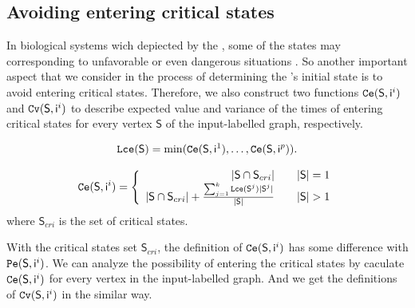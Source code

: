 \subsection{Avoiding entering critical states}
In biological systems wich depiected by the \BCNs, some of the states may corresponding to unfavorable or even dangerous situations \cite{Li2014Controllability}. So another important aspect that we consider in the process of determining the \BCN's initial state is to avoid entering critical states. Therefore, we also construct two functions ${\tt Ce}(\mathsf{S}, \mathsf{ i}^{i})$ and ${\tt Cv}(\mathsf{S}, \mathsf{ i}^{i})$ to describe expected value and variance of the times of entering critical states for every vertex $\mathsf{S}$ of the input-labelled graph, respectively. 
\begin{definition} \label{lce}
\begin{equation}
\begin{split}
{\tt Lce}(\mathsf{S})= \min({\tt Ce}(\mathsf{S}, \mathsf{ i}^{1}),\ldots,{\tt Ce}(\mathsf{S}, \mathsf{ i}^{p})).
\end{split}
\end{equation}
\end{definition}
\begin{definition} 
\[\Ce(\mathsf{S}, \mathsf{ i}^{i})=\left\{
\begin{array}{rcl}
|\mathsf{S} \cap \mathsf{S}_{cri} |      &      & {|\mathsf{S}|=1}\\
|\mathsf{S} \cap \mathsf{S}_{cri}| +\frac{\sum_{j=1}^k \Lce(\mathsf{S}^{j})|\mathsf{S}^{j}|}{ |\mathsf{S}|}     &      & {|\mathsf{S}|>1}
\end{array} \right. \]
where $\mathsf{S}_{cri}$ is the set of critical states.
\end{definition}

With the critical states set $\mathsf{S}_{cri}$, the definition of ${\tt Ce}(\mathsf{S}, \mathsf{ i}^{i})$ has some difference with ${\tt Pe}(\mathsf{S}, \mathsf{ i}^{i})$. We can analyze the possibility of entering the critical states by caculate ${\tt Ce}(\mathsf{S}, \mathsf{ i}^{i})$ for every vertex in the input-labelled graph. And we get the definitions of ${\tt Cv}(\mathsf{S}, \mathsf{ i}^{i})$ in the similar way.


